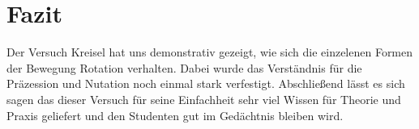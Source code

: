 

\chapter{Fazit}
\label{chap:fazit}

Der Versuch Kreisel hat uns demonstrativ gezeigt, wie sich die einzelenen Formen der Bewegung Rotation verhalten. Dabei wurde das Verständnis für die Präzession und Nutation noch einmal stark verfestigt. Abschließend lässt es sich sagen das dieser Versuch für seine Einfachheit sehr viel Wissen für Theorie und Praxis geliefert und den Studenten gut im Gedächtnis bleiben wird.